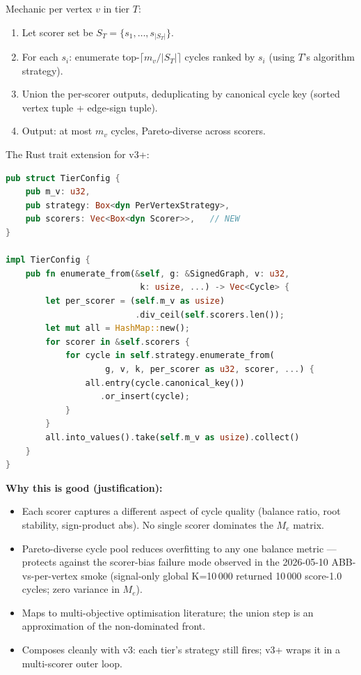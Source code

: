 \documentclass[11pt,a4paper]{article}
\begin{document}
Mechanic per vertex $v$ in tier $T$:
\begin{enumerate}
\item Let scorer set be $S_T = \{s_1, \dots, s_{|S_T|}\}$.
\item For each $s_i$: enumerate top-$\lceil m_v / |S_T| \rceil$ cycles
  ranked by $s_i$ (using $T$'s algorithm strategy).
\item Union the per-scorer outputs, deduplicating by canonical
  cycle key (sorted vertex tuple + edge-sign tuple).
\item Output: at most $m_v$ cycles, Pareto-diverse across scorers.
\end{enumerate}

The Rust trait extension for v3+:
\begin{lstlisting}[language=rust]
pub struct TierConfig {
    pub m_v: u32,
    pub strategy: Box<dyn PerVertexStrategy>,
    pub scorers: Vec<Box<dyn Scorer>>,   // NEW
}

impl TierConfig {
    pub fn enumerate_from(&self, g: &SignedGraph, v: u32,
                           k: usize, ...) -> Vec<Cycle> {
        let per_scorer = (self.m_v as usize)
                          .div_ceil(self.scorers.len());
        let mut all = HashMap::new();
        for scorer in &self.scorers {
            for cycle in self.strategy.enumerate_from(
                    g, v, k, per_scorer as u32, scorer, ...) {
                all.entry(cycle.canonical_key())
                   .or_insert(cycle);
            }
        }
        all.into_values().take(self.m_v as usize).collect()
    }
}
\end{lstlisting}

\textbf{Why this is good (justification):}
\begin{itemize}
\item Each scorer captures a different aspect of cycle quality
  (balance ratio, root stability, sign-product abs).  No single
  scorer dominates the $M_e$ matrix.
\item Pareto-diverse cycle pool reduces overfitting to any one
  balance metric --- protects against the scorer-bias failure mode
  observed in the 2026-05-10 ABB-vs-per-vertex smoke (signal-only
  global K=10\,000 returned 10\,000 score-1.0 cycles; zero variance
  in $M_e$).
\item Maps to multi-objective optimisation literature; the union
  step is an approximation of the non-dominated front.
\item Composes cleanly with v3: each tier's strategy still fires;
  v3+ wraps it in a multi-scorer outer loop.
\end{itemize}
\end{document}
